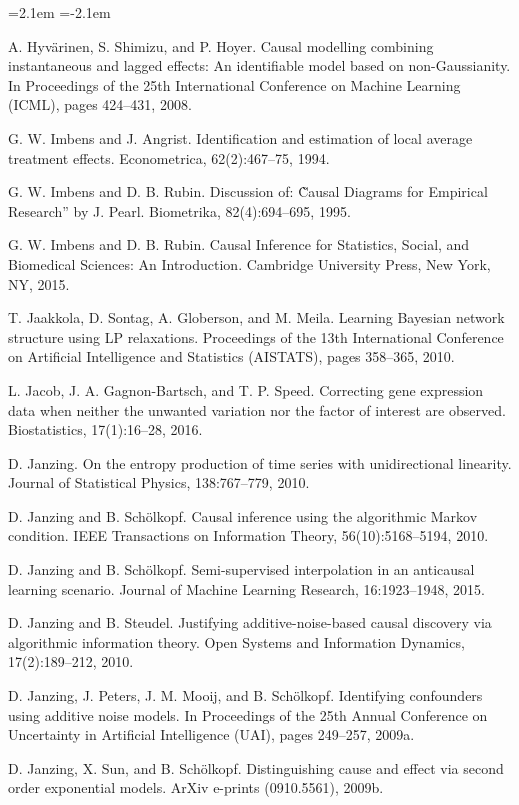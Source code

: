 \begin{list}{}{\leftmargin=2.1em
 \itemindent=-2.1em\parsep=0pt\itemsep=3pt}
\item A. Hyvärinen, S. Shimizu, and P. Hoyer. Causal modelling combining instantaneous and lagged effects: An identifiable model based on non-Gaussianity. In Proceedings of the 25th International Conference on Machine Learning (ICML), pages 424--431, 2008.
\item G. W. Imbens and J. Angrist. Identification and estimation of local average treatment effects. Econometrica, 62(2):467--75, 1994.
\item G. W. Imbens and D. B. Rubin. Discussion of: C̀̀ausal Diagrams for Empirical Research'' by J. Pearl. Biometrika, 82(4):694--695, 1995.
\item G. W. Imbens and D. B. Rubin. Causal Inference for Statistics, Social, and Biomedical Sciences: An Introduction. Cambridge University Press, New York, NY, 2015.
\item T. Jaakkola, D. Sontag, A. Globerson, and M. Meila. Learning Bayesian network structure using LP relaxations. Proceedings of the 13th International Conference on Artificial Intelligence and Statistics (AISTATS), pages 358--365, 2010.
\item L. Jacob, J. A. Gagnon-Bartsch, and T. P. Speed. Correcting gene expression data when neither the unwanted variation nor the factor of interest are observed. Biostatistics, 17(1):16--28, 2016.
\item D. Janzing. On the entropy production of time series with unidirectional linearity. Journal of Statistical Physics, 138:767--779, 2010.
\item D. Janzing and B. Schölkopf. Causal inference using the algorithmic Markov condition. IEEE Transactions on Information Theory, 56(10):5168--5194, 2010.
\item D. Janzing and B. Schölkopf. Semi-supervised interpolation in an anticausal learning scenario. Journal of Machine Learning Research, 16:1923--1948, 2015.
\item D. Janzing and B. Steudel. Justifying additive-noise-based causal discovery via algorithmic information theory. Open Systems and Information Dynamics, 17(2):189--212, 2010.
\item D. Janzing, J. Peters, J. M. Mooij, and B. Schölkopf. Identifying confounders using additive noise models. In Proceedings of the 25th Annual Conference on Uncertainty in Artificial Intelligence (UAI), pages 249--257, 2009a.
\item D. Janzing, X. Sun, and B. Schölkopf. Distinguishing cause and effect via second order exponential models. ArXiv e-prints (0910.5561), 2009b.

\end{list}
